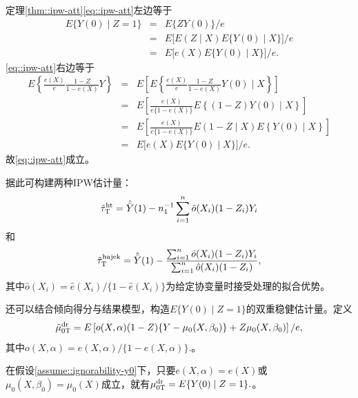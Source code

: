 \begin{myproof}{定理}{\ref{thm::ipw-att}}\eqref{eq::ipw-att}左边等于
\begin{eqnarray*}
E\{ Y(0) \mid Z=1 \} &=& E\{ ZY(0)   \} /e \\
&=& E\big[  E( Z \mid X) E\{ Y(0) \mid X  \} \big] /e \\
&=&E\big[ e(X)  E\{ Y(0) \mid X  \} \big] /e . 
\end{eqnarray*}
\eqref{eq::ipw-att}右边等于
\begin{eqnarray*}
E\left\{         \frac{e(X)}{e}  \frac{1-Z}{1-e(X)} Y \right\} 
&=& E\left[  E\left\{         \frac{e(X)}{e}  \frac{1-Z}{1-e(X)} Y(0) \mid X \right\}  \right]\\
&=& E\left[   \frac{e(X)}{e \{1-e(X)\} }   E\left\{       (1-Z)Y(0) \mid X \right\}  \right]\\
&=& E\left[   \frac{e(X)}{e \{1-e(X)\} }   E(      1-Z\mid X )   E\left\{       Y(0) \mid X \right\}  \right]\\
&=& E\big[ e(X)  E\{ Y(0) \mid X  \} \big] /e .  
\end{eqnarray*}
故\eqref{eq::ipw-att}成立。 
\end{myproof}




据此可构建两种IPW估计量：
$$
\hat{\tau}_\textsc{T}^\text{ht} =  \hat{\bar{Y}}(1) - n_1^{-1} \sum_{i=1}^n \hat{o}(X_i) (1-Z_i) Y_i
$$
和
$$
\hat{\tau}_\textsc{T}^\text{hajek} = \hat{\bar{Y}}(1) 
- \frac{  \sum_{i=1}^n \hat{o}(X_i) (1-Z_i) Y_i }{ \sum_{i=1}^n \hat{o}(X_i) (1-Z_i) } ,
$$
其中$\hat{o}(X_i) = \hat{e}(X_i) / \{ 1 - \hat{e}(X_i)  \} $为给定协变量时接受处理的拟合优势。

 
 



还可以结合倾向得分与结果模型，构造$E\{  Y(0)\mid Z=1\}$的双重稳健估计量。定义
\begin{eqnarray}
\label{eq::dr-att-mu0}
\tilde{\mu}_{0\textsc{T}}^\textup{dr} = E\left[ o(X,\alpha)  (1-Z) \{ Y - \mu_0(X, \beta_0) \}     + Z  \mu_0(X, \beta_0) \right] /e, 
\end{eqnarray}
其中$o(X,\alpha)  = e(X,\alpha)/ \{ 1 - e(X,\alpha)\}.$。

\begin{theorem}
\label{thm::dr-att}
在假设\ref{assume::ignorability-y0}下，只要$ e(X,\alpha) = e(X)$或$\mu_0(X, \beta_0)=\mu_0(X) $成立，就有$\mu_{0\textsc{T}}^\text{dr}  = E\{ Y(0) \mid Z=1 \}.$。
\end{theorem}


